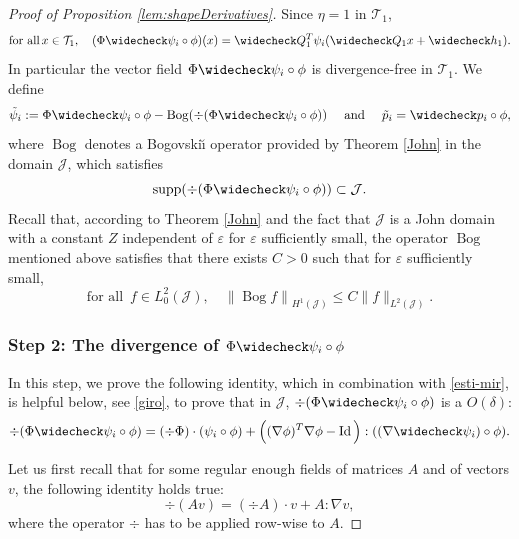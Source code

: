 \documentclass[JEP,XML,SOM,Unicode, NoEqCountersInSection,NoFloatCountersInSection,published]{cedram}
\let\eps\varepsilon
\DeclareMathOperator{\Bog}{Bog}
\DeclareMathOperator{\Id}{Id}
\DeclareMathOperator{\supp}{supp}
\theoremstyle{definition}
\theoremstyle{remark}
\begin{document}
\begin{proof}[Proof of Proposition \ref{lem:shapeDerivatives}]
Since $\eta = 1$ in $\mathcal T_1$,
\begin{equation} \label{soliv-v}
\text{for all} \, x \in \mathcal T_1, \quad
(\Phi \widecheck \psi_i \circ \phi)(x) = \widecheck Q_1^T \psi_i (\widecheck Q_1 x + \widecheck h_1).
\end{equation}
In particular the vector field
$\Phi \widecheck \psi_i \circ \phi$ is divergence-free in $\mathcal T_1$.
We define
\begin{equation} \label{kejetrans}
\tilde \psi_i := \Phi \widecheck \psi_i \circ \phi - \Bog (\div (\Phi \widecheck \psi_i \circ \phi)) \quad \text{ and } \quad
\tilde p_i = \widecheck p_i \circ \phi,
\end{equation}
where $\Bog$ denotes a Bogovski\u{\i} operator provided by Theorem \ref{John} in the domain $\mathcal J$, which satisfies
\begin{equation}\label{support}
\supp(\div(\Phi \widecheck \psi_i \circ \phi)) \subset \mathcal J.
\end{equation}
Recall that, according to Theorem \ref{John} and the fact that
$\mathcal J$ is a John domain with a constant $Z$ independent of $\eps$ for $\eps$ sufficiently small, the operator $\Bog$ mentioned above satisfies that there exists $C>0$ such that for $\eps$ sufficiently small,
\begin{equation} \label{Bog-J}
\text{for all } \, f \in L^2_0(\mathcal J), \quad \left\|\Bog f\right\|_{H^1 (\mathcal J) } \leq C \|f \|_{L^2 (\mathcal J)}.
\end{equation}

\subsubsection*{Step 2: The divergence of $\Phi \widecheck \psi_i \circ \phi$} In this step, we prove the following identity, which in combination with \eqref{esti-mir}, is helpful below, see \eqref{giro}, to prove that in $\mathcal J$,
$\div (\Phi \widecheck \psi_i \circ \phi)$ is a $O(\delta)$:
\begin{equation}\label{idenden}
\div (\Phi \widecheck \psi_i \circ \phi) =
(\div \Phi) \cdot (\psi_i \circ \phi) +
\Big(
(\nabla \phi)^T \nabla \phi - \Id \Big) : ((\nabla \widecheck \psi_i) \circ \phi).
\end{equation}

Let us first recall that for some regular enough fields of matrices $A$ and of vectors $v$, the following identity holds true:
\begin{equation} \label{piola}
\div (Av) = (\div A) \cdot v + A : \nabla v,
\end{equation}
where the operator $\div$ has to be applied row-wise to $A$.


\end{proof}
\end{document}
